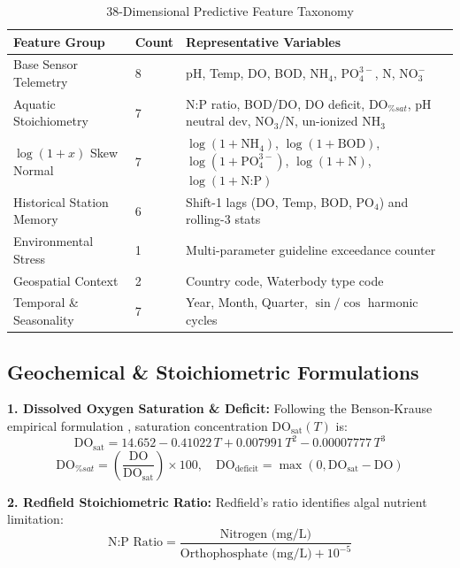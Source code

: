 \documentclass[conference]{IEEEtran}
\begin{document}
\begin{table}[htbp]
\caption{38-Dimensional Predictive Feature Taxonomy}
\label{tab:feature_taxonomy}
\centering
\begin{tabular}{p{2.2cm}p{1.0cm}p{4.6cm}}
\toprule
\textbf{Feature Group} & \textbf{Count} & \textbf{Representative Variables} \\
\midrule
Base Sensor Telemetry & 8 & pH, Temp, DO, BOD, $\text{NH}_4$, $\text{PO}_4^{3-}$, N, $\text{NO}_3^-$ \\
Aquatic Stoichiometry & 7 & N:P ratio, BOD/DO, DO deficit, $\text{DO}_{\%sat}$, pH neutral dev, $\text{NO}_3$/N, un-ionized $\text{NH}_3$ \\
$\log(1+x)$ Skew Normal & 7 & $\log(1+\text{NH}_4)$, $\log(1+\text{BOD})$, $\log(1+\text{PO}_4^{3-})$, $\log(1+\text{N})$, $\log(1+\text{N:P})$ \\
Historical Station Memory & 6 & Shift-1 lags (DO, Temp, BOD, $\text{PO}_4$) and rolling-3 stats \\
Environmental Stress & 1 & Multi-parameter guideline exceedance counter \\
Geospatial Context & 2 & Country code, Waterbody type code \\
Temporal \& Seasonality & 7 & Year, Month, Quarter, $\sin/\cos$ harmonic cycles \\
\bottomrule
\end{tabular}
\end{table}

\subsection{Geochemical \& Stoichiometric Formulations}
\textbf{1. Dissolved Oxygen Saturation \& Deficit:} Following the Benson-Krause empirical formulation \cite{benson1984solubility}, saturation concentration $\text{DO}_{\text{sat}}(T)$ is:
\begin{equation}
\text{DO}_{\text{sat}} = 14.652 - 0.41022\,T + 0.007991\,T^2 - 0.00007777\,T^3
\end{equation}
\begin{equation}
\text{DO}_{\%sat} = \left( \frac{\text{DO}}{\text{DO}_{\text{sat}}} \right) \times 100, \quad \text{DO}_{\text{deficit}} = \max\left(0, \text{DO}_{\text{sat}} - \text{DO}\right)
\end{equation}

\textbf{2. Redfield Stoichiometric Ratio:} Redfield's ratio \cite{redfield1958biological} identifies algal nutrient limitation:
\begin{equation}
\text{N:P Ratio} = \frac{\text{Nitrogen (mg/L)}}{\text{Orthophosphate (mg/L)} + 10^{-5}}
\end{equation}
\end{document}
